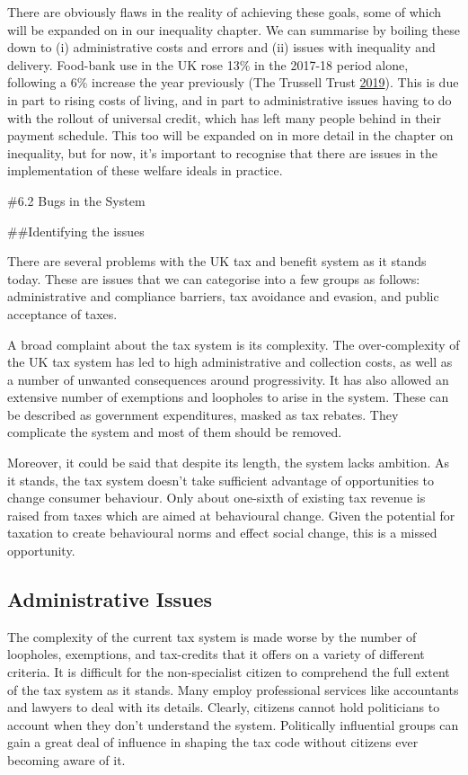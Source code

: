 \documentclass[]{tufte-handout}
\begin{document}
There are obviously flaws in the reality of achieving these goals, some
of which will be expanded on in our inequality chapter. We can summarise
by boiling these down to (i) administrative costs and errors and (ii)
issues with inequality and delivery. Food-bank use in the UK rose 13\%
in the 2017-18 period alone, following a 6\% increase the year
previously (The Trussell Trust
\protect\hyperlink{ref-TheTrussellTrust2019}{2019}). This is due in part
to rising costs of living, and in part to administrative issues having
to do with the rollout of universal credit, which has left many people
behind in their payment schedule. This too will be expanded on in more
detail in the chapter on inequality, but for now, it's important to
recognise that there are issues in the implementation of these welfare
ideals in practice.

\#6.2 Bugs in the System

\#\#Identifying the issues

There are several problems with the UK tax and benefit system as it
stands today. These are issues that we can categorise into a few groups
as follows: administrative and compliance barriers, tax avoidance and
evasion, and public acceptance of taxes.

A broad complaint about the tax system is its complexity. The
over-complexity of the UK tax system has led to high administrative and
collection costs, as well as a number of unwanted consequences around
progressivity. It has also allowed an extensive number of exemptions and
loopholes to arise in the system. These can be described as government
expenditures, masked as tax rebates. They complicate the system and most
of them should be removed.

Moreover, it could be said that despite its length, the system lacks
ambition. As it stands, the tax system doesn't take sufficient advantage
of opportunities to change consumer behaviour. Only about one-sixth of
existing tax revenue is raised from taxes which are aimed at behavioural
change. Given the potential for taxation to create behavioural norms and
effect social change, this is a missed opportunity.

\hypertarget{administrative-issues}{%
\subsection{Administrative Issues}\label{administrative-issues}}

The complexity of the current tax system is made worse by the number of
loopholes, exemptions, and tax-credits that it offers on a variety of
different criteria. It is difficult for the non-specialist citizen to
comprehend the full extent of the tax system as it stands. Many employ
professional services like accountants and lawyers to deal with its
details. Clearly, citizens cannot hold politicians to account when they
don't understand the system. Politically influential groups can gain a
great deal of influence in shaping the tax code without citizens ever
becoming aware of it.
\end{document}
